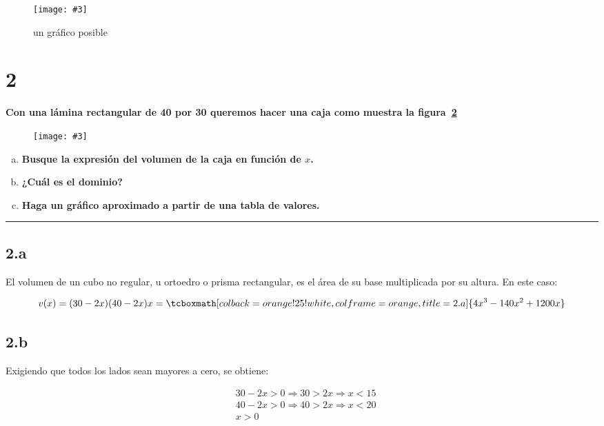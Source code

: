 \documentclass{article}
\newcommand{\hresult}[2]{\tcboxmath[colback=orange!25!white,colframe=orange, title=#1] {#2} }
\newcommand{\figurex}[4]{\begin{figure}[ht] \caption{#1} \texttt{[image: \#3]} \centering \label{#4}\end{figure}}
\newcommand{\sectionx}[1]{\section*{#1}\label{sec:#1}\addcontentsline{toc}{section}{\nameref{sec:#1}}}
\begin{document}
\newpage

\figurex{un gráfico posible}{0.17}{../img/guide_01/ex_01.png}{fig:1}

\sectionx{2}

\textbf{Con una lámina rectangular de 40 por 30 queremos hacer una caja como muestra la figura~\ref{fig:2}}

\figurex{}{2}{../img/guide_01/ex_02.png}{fig:2}

\begin{enumerate}[(a)]

\bfseries

\item \textbf{Busque la expresión del volumen de la caja en función de $x$. }

\item \textbf{¿Cuál es el dominio?}

\item \textbf{Haga un gráfico aproximado a partir de una tabla de valores.}

\end{enumerate}
\hrule

\subsection*{2.a}
\label{subsec:2.a}

El volumen de un cubo no regular, u ortoedro o prisma rectangular, es el área de su base multiplicada por su altura. En este caso:

\begin{equation}
v(x) = (30-2x)(40-2x)x = \hresult{2.a}{ 4x^3 - 140x^2 +1200x }
\end{equation}

\subsection*{2.b}
\label{subsec:2.b}

Exigiendo que todos los lados sean mayores a cero, se obtiene:

\begin{subequations}
\begin{align}
& 30 - 2x > 0 \Rightarrow 30 > 2x \Rightarrow x < 15 \\
& 40 - 2x > 0 \Rightarrow 40 > 2x \Rightarrow x < 20 \\
& x > 0
\end{align}
\end{subequations}
\end{document}
